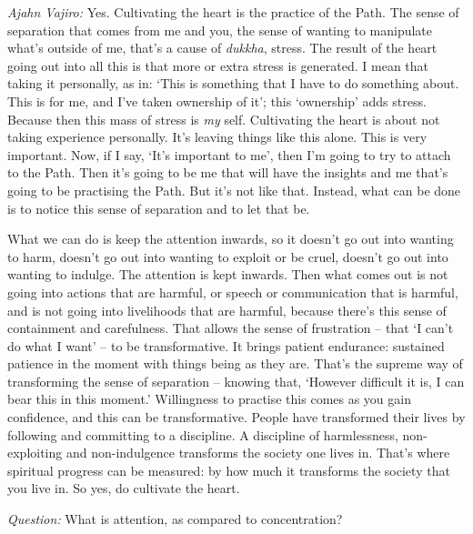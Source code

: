 \emph{Ajahn Vajiro:} Yes. Cultivating the heart is the practice of the Path. The sense
of separation that comes from me and you, the sense of wanting to manipulate
what's outside of me, that's a cause of \emph{dukkha}, stress. The result of the
heart going out into all this is that more or extra stress is generated. I mean that
taking it personally, as in: `This is something that I have to do something
about. This is for me, and I've taken ownership of it'; this `ownership' adds
stress. Because then this mass of stress is \emph{my} self. Cultivating the
heart is about not taking experience personally. It's leaving things like this
alone. This is very important. Now, if I say, `It's important to me', then I'm
going to try to attach to the Path. Then it's going to be me that will have the
insights and me that's going to be practising the Path. But it's not like that.
Instead, what can be done is to notice this sense of separation and to let that
be.

\enlargethispage{\baselineskip}

What we can do is keep the attention inwards, so it doesn't go out into wanting
to harm, doesn't go out into wanting to exploit or be cruel, doesn't go out into
wanting to indulge. The attention is kept inwards. Then what comes out is not
going into actions that are harmful, or speech or communication that is harmful, and is not going into livelihoods
that are harmful, because there's this sense of containment and carefulness. That allows the
sense of frustration -- that `I can't do what I want' -- to be transformative.
It brings patient endurance: sustained patience in the moment with things being as they
are. That's the supreme way of transforming the sense of separation -- knowing
that, `However difficult it is, I can bear this in this moment.' Willingness to
practise this comes as you gain confidence, and this can be transformative.
People have transformed their lives by following and committing to a discipline.
A discipline of harmlessness, non-exploiting and non-indulgence transforms the
society one lives in. That's where spiritual progress can be measured: by how
much it transforms the society that you live in. So yes, do cultivate the heart.

\bigskip

\emph{Question:} What is attention, as compared to concentration?


